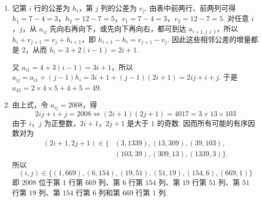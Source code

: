 \begin{solution}
\begin{enumerate}
\item 记第 \(i\) 行的公差为 \(h_i\)，第 \(j\) 列的公差为 \(v_j\). 由表中前两行、前两列可得 \(h_1=7-4=3\)，\(h_2=12-7=5\)，\(v_1=7-4=3\)，\(v_2=12-7=5\). 对任意 \(i\)，\(j\)，从 \(a_{ij}\) 先向右再向下，或先向下再向右，都可到达 \(a_{i+1,j+1}\)，所以 \(h_i+v_{j+1}=v_j+h_{i+1}\)，即 \(h_{i+1}-h_i=v_{j+1}-v_j\). 因此这些相邻公差的增量都是 \(2\)，从而 \(h_i=3+2\left(i-1\right)=2i+1\).

又 \(a_{i1}=4+3\left(i-1\right)=3i+1\)，所以 \(a_{ij}=a_{i1}+\left(j-1\right)h_i=3i+1+\left(j-1\right)\left(2i+1\right)=2ij+i+j\). 于是 \(a_{45}=2\times4\times5+4+5=49\).

\item 由上式，令 \(a_{ij}=2008\)，得
\[
2ij+i+j=2008\Longleftrightarrow(2i+1)(2j+1)=4017=3\times13\times103
\]
由于 \(i\)，\(j\) 为正整数，\(2i+1\)，\(2j+1\) 是大于 \(1\) 的奇数. 因而所有可能的有序因数对为
\[
\begin{split}
(2i+1,2j+1)\in\{&(3,1339),(13,309),(39,103),\\
&(103,39),(309,13),(1339,3)\}.
\end{split}
\]
所以
\[
(i,j)\in\{(1,669),(6,154),(19,51),(51,19),(154,6),(669,1)\}
\]
即 \(2008\) 位于第 \(1\) 行第 \(669\) 列、第 \(6\) 行第 \(154\) 列、第 \(19\) 行第 \(51\) 列、第 \(51\) 行第 \(19\) 列、第 \(154\) 行第 \(6\) 列和第 \(669\) 行第 \(1\) 列.
\end{enumerate}
\end{solution}
